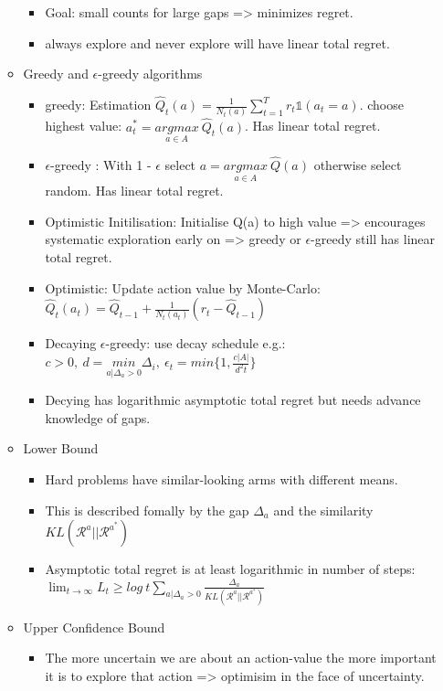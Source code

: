 \begin{itemize}
\begin{itemize}[noitemsep,nolistsep]
\begin{itemize}[noitemsep,nolistsep]
			\item Goal: small counts for large gaps => minimizes regret.
			\item always explore and never explore will have linear total regret.
		\end{itemize}
		\item Greedy and $\epsilon$-greedy algorithms
		\begin{itemize}[noitemsep,nolistsep]
			\item greedy: Estimation $\hat{Q}_t(a) = \frac{1}{N_t(a)} \sum_{t=1}^T r_t \mathbb{1}(a_t = a)$. choose highest value: $a_t^* = \underset{a \in A}{argmax}\ \hat{Q}_t(a)$. Has linear total regret.
			\item $\epsilon$-greedy : With 1 - $\epsilon$ select $a = \underset{a \in A}{argmax}\ \hat{Q}(a)$ otherwise select random. Has linear total regret.
			\item Optimistic Initilisation: Initialise Q(a) to high value => encourages systematic exploration early on => greedy or $\epsilon$-greedy still has linear total regret.
			\item Optimistic: Update action value by Monte-Carlo: $\hat{Q}_t(a_t) = \hat{Q}_{t-1} + \frac{1}{N_t(a_t)}(r_t - \hat{Q}_{t-1})$
			\item Decaying $\epsilon$-greedy: use decay schedule e.g.: $c > 0,\ d = \underset{a|\Delta_a > 0}{min} \Delta_i,\ \epsilon_t = min\{1, \frac{c|A|}{d^2t}\}$
			\item Decying has logarithmic asymptotic total regret but needs advance knowledge of gaps.
		\end{itemize}
		\item Lower Bound
		\begin{itemize}[noitemsep,nolistsep]
			\item Hard problems have similar-looking arms with different means. 
			\item This is described fomally by the gap $\Delta_a$ and the similarity $KL(\mathcal{R}^a||\mathcal{R}^{a^*})$
			\item Asymptotic total regret is at least logarithmic in number of steps: $\lim_{t \rightarrow \infty} L_t \geq log\ t \sum_{a|\Delta_a > 0} \frac{\Delta_a}{KL(\mathcal{R}^a|| \mathcal{R}^{a^*})}$
		\end{itemize}
		\item Upper Confidence Bound
		\begin{itemize}[noitemsep,nolistsep]
			\item The more uncertain we are about an action-value the more important it is to explore that action => optimisim in the face of uncertainty.

\end{itemize}
\end{itemize}
\end{itemize}
